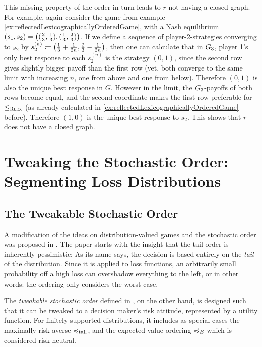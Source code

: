 \documentclass[a4paper]{scrreprt}
\begin{document}
    This missing property of the order in turn leads to $r$ not having a closed graph. For example, again consider the game from example \ref{ex:reflectedLexicographicallyOrderedGame}, with a Nash equilibrium $(s_1, s_2) = \left((\frac{2}{3}, \frac{1}{3}), (\frac{1}{3}, \frac{2}{3})\right)$.
    If we define a sequence of player-2-strategies converging to $s_2$ by $s_2^{(n)} \coloneqq \left(\frac{1}{3} + \frac{1}{2n}, \frac{2}{3} - \frac{1}{2n}\right)$, then one can calculate that in $G_{3}$, player 1's only best response to each $s_2^{(n)}$ is the strategy $(0, 1)$, since the second row gives slightly bigger payoff than the first row (yet, both converge to the same limit with increasing $n$, one from above and one from below). Therefore $(0, 1)$ is also the unique best response in $G$.
    However in the limit, the $G_{3}$-payoffs of both rows become equal, and the second coordinate makes the first row preferable for $\leq_{\textsc{Rlex}}$ (as already calculated in \ref{ex:reflectedLexicographicallyOrderedGame} before). Therefore $(1, 0)$ is the unique best response to $s_2$. This shows that $r$ does not have a closed graph.
    
    \chapter{Tweaking the Stochastic Order: Segmenting Loss Distributions}
    \newcommand{\Fab}{\mathfrak{F}_{[a, b]}} %
    
    \section{The Tweakable Stochastic Order}
    A modification of the ideas on distribution-valued games and the stochastic order was proposed in \cite{bib:tweakableStochasticOrders}.
    The paper starts with the insight that the tail order is inherently pessimistic: As its name says, the decision is based entirely on the \emph{tail} of the distribution. Since it is applied to loss functions, an arbitrarily small probability off a high loss can overshadow everything to the left, or in other words: the ordering only considers the worst case.
        
    The \emph{tweakable stochastic order} defined in \cite{bib:tweakableStochasticOrders}, on the other hand,
    is designed such that it can be tweaked to a decision maker's risk attitude, represented by a utility function.
    For finitely-supported distributions, it includes as special cases the maximally risk-averse $\preccurlyeq_{\text{tail}}$, and the expected-value-ordering $\preccurlyeq_E$ which is considered risk-neutral.
    
\end{document}
